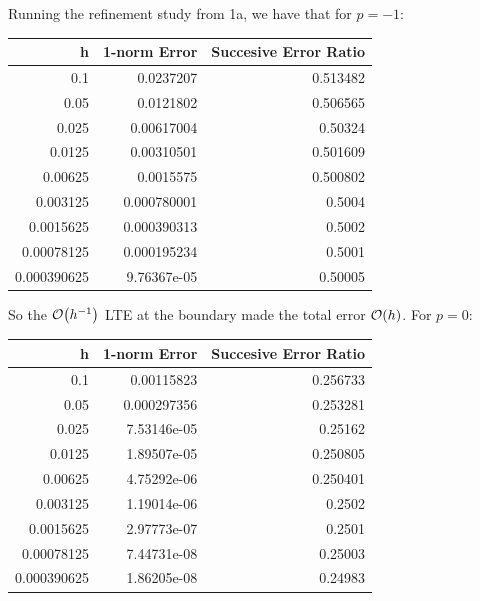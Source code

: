 \documentclass[12pt]{article}
\begin{document}
Running the refinement study from 1a, we have that for $p=-1$:\\
\begin{center}
\begin{tabular}{rrr}
\hline
    h &  1-norm Error &   Succesive Error Ratio \\
\hline
 0.1         &                   0.0237207   &                0.513482 \\
 0.05        &                   0.0121802   &                0.506565 \\
 0.025       &                   0.00617004  &                0.50324  \\
 0.0125      &                   0.00310501  &                0.501609 \\
 0.00625     &                   0.0015575   &                0.500802 \\
 0.003125    &                   0.000780001 &                0.5004   \\
 0.0015625   &                   0.000390313 &                0.5002   \\
 0.00078125  &                   0.000195234 &                0.5001   \\
 0.000390625 &                   9.76367e-05 &                0.50005  \\
\hline
\end{tabular}
\end{center}
So the $\order{h^{-1}}$ LTE at the boundary made the total error $\order{h}$.
For $p=0$:\\
\begin{center}
\begin{tabular}{rrr}
\hline
    h &   1-norm Error &   Succesive Error Ratio \\
\hline
 0.1         &                   0.00115823  &                0.256733 \\
 0.05        &                   0.000297356 &                0.253281 \\
 0.025       &                   7.53146e-05 &                0.25162  \\
 0.0125      &                   1.89507e-05 &                0.250805 \\
 0.00625     &                   4.75292e-06 &                0.250401 \\
 0.003125    &                   1.19014e-06 &                0.2502   \\
 0.0015625   &                   2.97773e-07 &                0.2501   \\
 0.00078125  &                   7.44731e-08 &                0.25003  \\
 0.000390625 &                   1.86205e-08 &                0.24983  \\
\hline
\end{tabular} 
\end{center}
\end{document}
